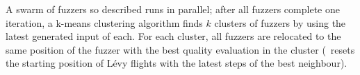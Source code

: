 A swarm of fuzzers so described runs in parallel; after all fuzzers complete one
iteration, a k-means clustering algorithm finds $k$ clusters of fuzzers by using
the latest generated input of each. For each cluster, all fuzzers are relocated
to the same position of the fuzzer with the best quality evaluation in the
cluster (\ie~resets the starting position of L\'evy flights with the latest
steps of the best neighbour).



